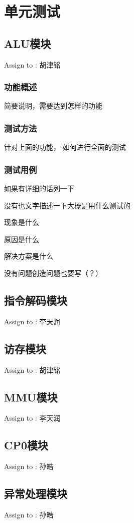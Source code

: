 \section{单元测试}


    \subsection{ALU模块}
        Assign to : 胡津铭

        \subsubsection{功能概述}
            简要说明，需要达到怎样的功能

        \subsubsection{测试方法}
            针对上面的功能，%
            如何进行全面的测试

        \subsubsection{测试用例}
            如果有详细的话列一下

            没有也文字描述一下大概是用什么测试的

            现象是什么

            原因是什么

            解决方案是什么

            没有问题创造问题也要写（？）


    \subsection{指令解码模块}
        Assign to : 李天润

    \subsection{访存模块}
        Assign to : 胡津铭

    \subsection{MMU模块}
        Assign to  : 李天润

    \subsection{CP0模块}
        Assign to  : 孙皓

    \subsection{异常处理模块}
        Assign to  : 孙皓
